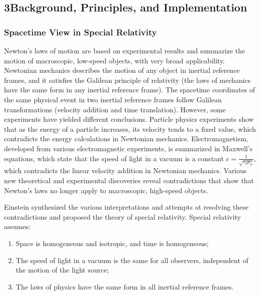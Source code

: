 \documentclass{article}
\begin{document}
\subsection*{3\quad Background, Principles, and Implementation}

\subsubsection*{Spacetime View in Special Relativity}

Newton's laws of motion are based on experimental results and summarize the motion of macroscopic, low-speed objects, with very broad applicability. Newtonian mechanics describes the motion of any object in inertial reference frames, and it satisfies the Galilean principle of relativity (the laws of mechanics have the same form in any inertial reference frame). The spacetime coordinates of the same physical event in two inertial reference frames follow Galilean transformations (velocity addition and time translation). However, some experiments have yielded different conclusions. Particle physics experiments show that as the energy of a particle increases, its velocity tends to a fixed value, which contradicts the energy calculations in Newtonian mechanics. Electromagnetism, developed from various electromagnetic experiments, is summarized in Maxwell's equations, which state that the speed of light in a vacuum is a constant $c = \frac{1}{\sqrt{\varepsilon_0 \mu_0}}$, which contradicts the linear velocity addition in Newtonian mechanics. Various new theoretical and experimental discoveries reveal contradictions that show that Newton's laws no longer apply to macroscopic, high-speed objects.

Einstein synthesized the various interpretations and attempts at resolving these contradictions and proposed the theory of special relativity. Special relativity assumes:
\begin{enumerate}[(1)]
    \item Space is homogeneous and isotropic, and time is homogeneous;
    \item The speed of light in a vacuum is the same for all observers, independent of the motion of the light source;
    \item The laws of physics have the same form in all inertial reference frames.
\end{enumerate}
\end{document}
